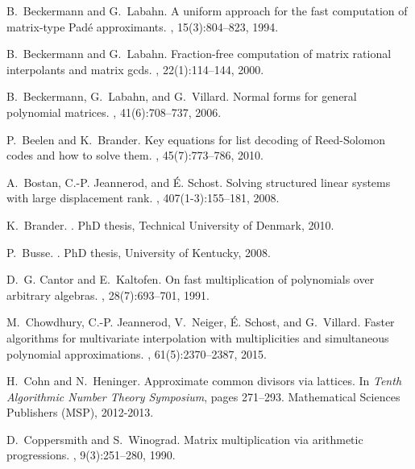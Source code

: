 \documentclass[preprint]{sig-alternate-05-2015}
\begin{document}
\begin{small}
\begin{thebibliography}{10}

B.~Beckermann and G.~Labahn.
\newblock A uniform approach for the fast computation of matrix-type {P}ad\'e
  approximants.
, 15(3):804--823, 1994.

B.~Beckermann and G.~Labahn.
\newblock Fraction-free computation of matrix rational interpolants and matrix
  gcds.
, 22(1):114--144, 2000.

B.~Beckermann, G.~Labahn, and G.~Villard.
\newblock Normal forms for general polynomial matrices.
, 41(6):708--737, 2006.

P.~Beelen and K.~Brander.
\newblock Key equations for list decoding of {R}eed-{S}olomon codes and how to
  solve them.
, 45(7):773--786, 2010.

A.~Bostan, C.-P. Jeannerod, and \'{E}. Schost.
\newblock Solving structured linear systems with large displacement rank.
, 407(1-3):155--181, 2008.

K.~Brander.
.
\newblock PhD thesis, Technical University of Denmark, 2010.

P.~Busse.
.
\newblock PhD thesis, University of Kentucky, 2008.

D.~G. Cantor and E.~Kaltofen.
\newblock On fast multiplication of polynomials over arbitrary algebras.
, 28(7):693--701, 1991.

M.~Chowdhury, C.-P. Jeannerod, V.~Neiger, \'E. Schost, and G.~Villard.
\newblock Faster algorithms for multivariate interpolation with multiplicities
  and simultaneous polynomial approximations.
, 61(5):2370--2387, 2015.

H.~Cohn and N.~Heninger.
\newblock Approximate common divisors via lattices.
\newblock In {\em Tenth Algorithmic Number Theory Symposium}, pages 271--293.
  Mathematical Sciences Publishers (MSP), 2012-2013.

D.~Coppersmith and S.~Winograd.
\newblock Matrix multiplication via arithmetic progressions.
, 9(3):251--280, 1990.


\end{thebibliography}
\end{small}
\end{document}
